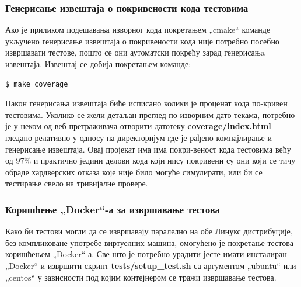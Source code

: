 \documentclass[a4paper, 12pt, diplomski]{etfcyr}
\def\quote#1{„#1“}
\begin{document}
				\subsubsection*{Генерисање извештаја о покривености кода тестовима}
					\begin{justify}
						Ако је приликом подешавања изворног кода покретањем \quote{cmake} команде укључено генерисање извештаја о покривености кода није потребно посебно извршавати тестове, пошто се они аутоматски покрећу зарад генерисањa извештаја. Извештај се добија покретањем команде:
						\begin{footnotesize}
							\begin{verbatim}
$ make coverage
							\end{verbatim}
						\end{footnotesize}
						Након генерисања извештаја биће исписано колики је проценат кода по-кривен тестовима. Уколико се жели детаљан преглед по изворним дато-текама, потребно је у неком од веб претраживача отворити датотеку \textbf{coverage/index.html} гледано релативно у односу на директоријум где је рађено компајлирање и генерисање извештаја. Овај пројекат има има покри-веност кода тестовима већу од 97\% и практично једини делови кода који нису покривени су они који се тичу обраде хардверских отказа које није било могуће симулирати, или би се тестирање свело на тривијалне провере.
					\end{justify}

				\subsubsection{Коришћење \quote{Docker}-а за извршавање тестова}
					\begin{justify}
						Како би тестови могли да се извршавају паралелно на обе Линукс дистрибуције, без компликоване употребе виртуелних машина, омогућено је покретање тестова коришћењем \quote{Docker}-а. Све што је потребно урадити јесте имати инсталиран \quote{Docker} и извршити скрипт \textbf{tests/setup\_test.sh} са аргументом \quote{ubuntu} или \quote{centos} у зависности под којим контејнером се тражи извршавање тестова.
					\end{justify}
					
\end{document}
